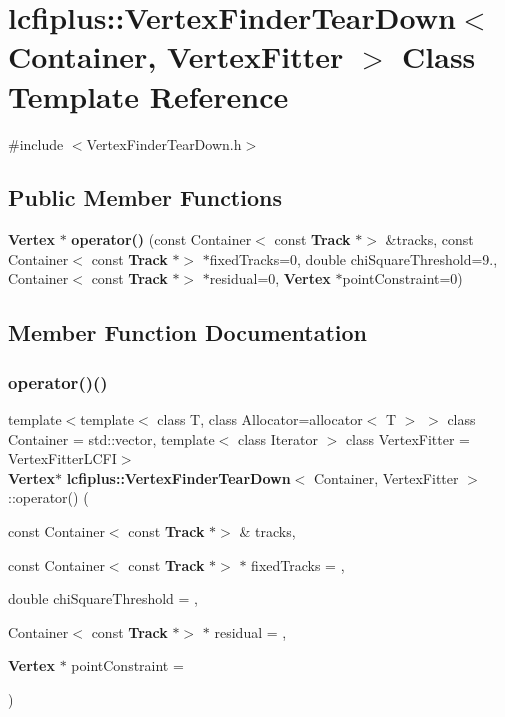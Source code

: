 \section{lcfiplus\+:\+:Vertex\+Finder\+Tear\+Down$<$ Container, Vertex\+Fitter $>$ Class Template Reference}
\label{classlcfiplus_1_1VertexFinderTearDown}


{\ttfamily \#include $<$Vertex\+Finder\+Tear\+Down.\+h$>$}

\subsection*{Public Member Functions}
\begin{DoxyCompactItemize}
\item 
\textbf{ Vertex} $\ast$ \textbf{ operator()} (const Container$<$ const \textbf{ Track} $\ast$$>$ \&tracks, const Container$<$ const \textbf{ Track} $\ast$$>$ $\ast$fixed\+Tracks=0, double chi\+Square\+Threshold=9., Container$<$ const \textbf{ Track} $\ast$$>$ $\ast$residual=0, \textbf{ Vertex} $\ast$point\+Constraint=0)
\end{DoxyCompactItemize}


\subsection{Member Function Documentation}
\mbox{\label{classlcfiplus_1_1VertexFinderTearDown_a8e128ef557af460fa01780a6675a4d34}} 
\subsubsection{operator()()}
{\footnotesize\ttfamily template$<$template$<$ class T, class Allocator=allocator$<$ T $>$ $>$ class Container = std\+::vector, template$<$ class Iterator $>$ class Vertex\+Fitter = Vertex\+Fitter\+L\+C\+FI$>$ \\
\textbf{ Vertex}$\ast$ \textbf{ lcfiplus\+::\+Vertex\+Finder\+Tear\+Down}$<$ Container, Vertex\+Fitter $>$\+::operator() (\begin{DoxyParamCaption}\item[{const Container$<$ const \textbf{ Track} $\ast$$>$ \&}]{tracks,  }\item[{const Container$<$ const \textbf{ Track} $\ast$$>$ $\ast$}]{fixed\+Tracks = {},  }\item[{double}]{chi\+Square\+Threshold = {},  }\item[{Container$<$ const \textbf{ Track} $\ast$$>$ $\ast$}]{residual = {},  }\item[{\textbf{ Vertex} $\ast$}]{point\+Constraint = {} }\end{DoxyParamCaption})\hspace{0.3cm}{\ttfamily [inline]}}



